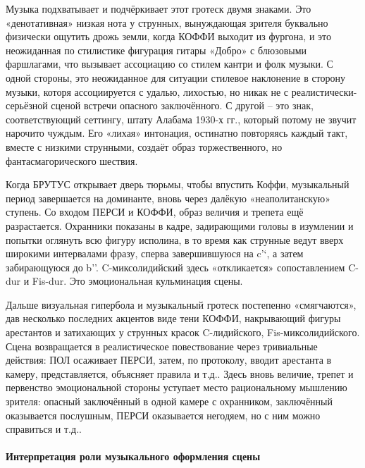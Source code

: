 Музыка подхватывает и подчёркивает этот гротеск двумя знаками.
Это «денотативная» низкая нота у струнных, вынуждающая зрителя буквально физически ощутить дрожь земли, когда КОФФИ выходит из фургона, и это неожиданная по стилистике фигурация гитары «Добро» с блюзовыми фаршлагами, что вызывает ассоциацию со стилем кантри и фолк музыки.
С одной стороны, это неожиданное для ситуации стилевое наклонение в сторону музыки, которя ассоциируется с удалью, лихостью, но никак не с реалистически-серьёзной сценой встречи опасного заключённого.
С другой -- это знак, соответствующий сеттингу, штату Алабама 1930-х гг., который потому не звучит нарочито чуждым.
Его «лихая» интонация, остинатно повторяясь каждый такт, вместе с низкими струнными, создаёт образ торжественного, но фантасмагорического шествия.

Когда БРУТУС открывает дверь тюрьмы, чтобы впустить Коффи, музыкальный период завершается на доминанте, вновь через далёкую «неаполитанскую» ступень.
Со входом ПЕРСИ и КОФФИ, образ величия и трепета ещё разрастается.
Охранники показаны в кадре, задирающими головы в изумлении и попытки оглянуть всю фигуру исполина, в то время как струнные ведут вверх широкими интервалами фразу, сперва завершившуюся на c'`, а затем забирающуюся до b''.
C-миксолидийский здесь «откликается» сопоставлением C-dur и Fis-dur.
Это эмоциональная кульминация сцены.

Дальше визуальная гипербола и музыкальный гротеск постепенно «смягчаются», дав несколько последних акцентов виде тени КОФФИ, накрывающий фигуры арестантов и затихающих у струнных красок C-лидийского, Fis-миксолидийского.
Сцена возвращается в реалистическое повествование через тривиальные действия: ПОЛ осаживает ПЕРСИ, затем, по протоколу, вводит арестанта в камеру, представляется, объясняет правила и т.д..
Здесь вновь величие, трепет и первенство эмоциональной стороны уступает место рациональному мышлению зрителя: опасный заключённый в одной камере с охранником, заключённый оказывается послушным, ПЕРСИ оказывается негодяем, но с ним можно справиться и т.д..

\paragraph{Интерпретация роли музыкального оформления сцены}\label{ux438ux43dux442ux435ux440ux43fux440ux435ux442ux430ux446ux438ux44f-ux440ux43eux43bux438-ux43cux443ux437ux44bux43aux430ux43bux44cux43dux43eux433ux43e-ux43eux444ux43eux440ux43cux43bux435ux43dux438ux44f-ux441ux446ux435ux43dux44b-1}

